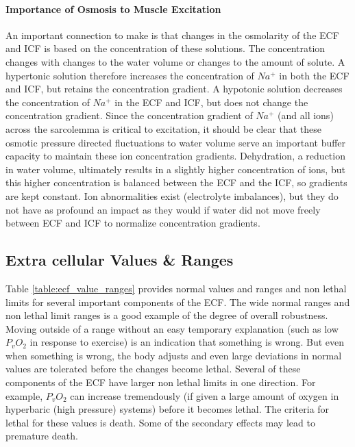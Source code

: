 \paragraph{Importance of Osmosis to Muscle Excitation}

An important connection to make is that changes in the osmolarity of the ECF and ICF is based on the concentration of these solutions. The concentration changes with changes to the water volume or changes to the amount of solute. A hypertonic solution therefore increases the concentration of $Na^+$ in both the ECF and ICF, but retains the concentration gradient. A hypotonic solution decreases the concentration of $Na^+$ in the ECF and ICF, but does not change the concentration gradient. Since the concentration gradient of $Na^+$ (and all ions) across the sarcolemma is critical to excitation, it should be clear that these osmotic pressure directed fluctuations to water volume serve an important buffer capacity to maintain these ion concentration gradients. Dehydration, a reduction in water volume, ultimately results in a slightly higher concentration of ions, but this higher concentration is balanced between the ECF and the ICF, so gradients are kept constant.
Ion abnormalities exist (electrolyte imbalances), but they do not have as profound an impact as they would if water did not move freely between ECF and ICF to normalize concentration gradients. 

\subsection{Extra cellular Values \& Ranges}

Table \ref{table:ecf_value_ranges} provides normal values and ranges and non lethal limits for several important components of the ECF.  The wide normal ranges and non lethal limit ranges is a good example of the degree of overall robustness. Moving outside of a range without an easy temporary explanation (such as low $P_v O_2$ in response to exercise) is an indication that something is wrong. But even when something is wrong, the body adjusts and even large deviations in normal values are tolerated before the changes become lethal. Several of these components of the ECF have larger non lethal limits in one direction. For example, $P_v O_2$ can increase tremendously (if given a large amount of oxygen in hyperbaric (high pressure) systems) before it becomes lethal. The criteria for lethal for these values is death. Some of the secondary effects may lead to premature death. 

